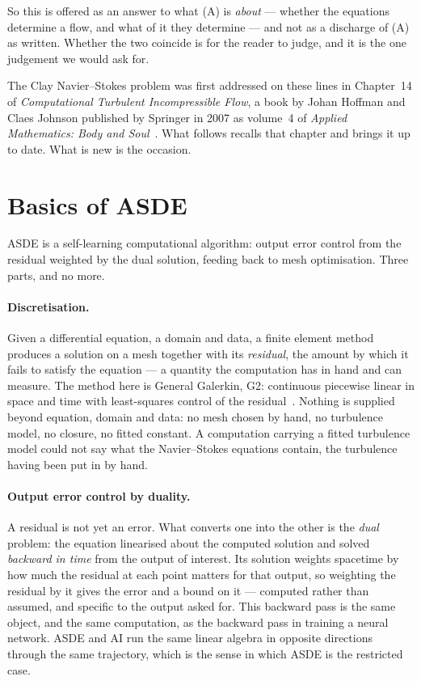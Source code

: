 \documentclass[11pt]{article}
\begin{document}
So this is offered as an answer to what (A) is \emph{about} --- whether the equations determine a
flow, and what of it they determine --- and not as a discharge of (A) as written. Whether the two
coincide is for the reader to judge, and it is the one judgement we would ask for.

The Clay Navier--Stokes problem was first addressed on these lines in Chapter~14 of
\emph{Computational Turbulent Incompressible Flow}, a book by Johan Hoffman and Claes Johnson
published by Springer in 2007 as volume~4 of \emph{Applied Mathematics: Body and
Soul}~\cite{cfd}. What follows
recalls that chapter and brings it up to date. What is new is the occasion.


\section{Basics of ASDE}\label{sec:asde}

ASDE is a self-learning computational algorithm: output error control from the residual weighted by
the dual solution, feeding back to mesh optimisation. Three parts, and no more.

\paragraph{Discretisation.} Given a differential equation, a domain and data, a finite element method
produces a solution on a mesh together with its \emph{residual}, the amount by which it fails to
satisfy the equation --- a quantity the computation has in hand and can measure. The method here is
General Galerkin, G2: continuous piecewise linear in space and time with least-squares control of the
residual~\cite{fehn}. Nothing is supplied beyond equation, domain and data: no mesh chosen by hand, no
turbulence model, no closure, no fitted constant. A computation carrying a fitted turbulence model
could not say what the Navier--Stokes equations contain, the turbulence having been put in by hand.

\paragraph{Output error control by duality.} A residual is not yet an error. What converts one into
the other is the \emph{dual} problem: the equation linearised about the computed solution and solved
\emph{backward in time} from the output of interest. Its solution weights spacetime by how much the
residual at each point matters for that output, so weighting the residual by it gives the error and a
bound on it --- computed rather than assumed, and specific to the output asked for. This backward
pass is the same object, and the same computation, as the backward pass in training a neural network.
ASDE and AI run the same linear algebra in opposite directions through the same trajectory, which is
the sense in which ASDE is the restricted case.
\end{document}
